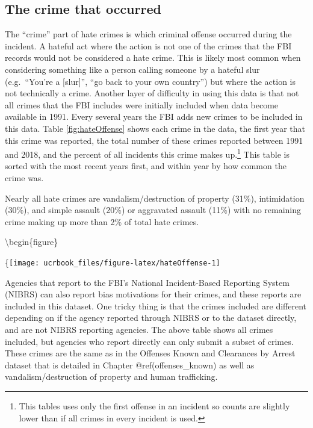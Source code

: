 \documentclass[
  12pt,
  openany]{book}
\begin{document}
\hypertarget{the-crime-that-occurred}{%
\subsection{The crime that occurred}\label{the-crime-that-occurred}}

The ``crime'' part of hate crimes is which criminal offense occurred during the incident. A hateful act where the action is not one of the crimes that the FBI records would not be considered a hate crime. This is likely most common when considering something like a person calling someone by a hateful slur (e.g.~``You're a {[}slur{]}'', ``go back to your own country'') but where the action is not technically a crime. Another layer of difficulty in using this data is that not all crimes that the FBI includes were initially included when data become available in 1991. Every several years the FBI adds new crimes to be included in this data. Table \ref{fig:hateOffense} shows each crime in the data, the first year that this crime was reported, the total number of these crimes reported between 1991 and 2018, and the percent of all incidents this crime makes up.\footnote{This tables uses only the first offense in an incident so counts are slightly lower than if all crimes in every incident is used.} This table is sorted with the most recent years first, and within year by how common the crime was.

Nearly all hate crimes are vandalism/destruction of property (31\%), intimidation (30\%), and simple assault (20\%) or aggravated assault (11\%) with no remaining crime making up more than 2\% of total hate crimes.

\textbackslash begin\{figure\}

\{\centering \texttt{[image: ucrbook\_files/figure-latex/hateOffense-1]}

Agencies that report to the FBI's National Incident-Based Reporting System (NIBRS) can also report bias motivations for their crimes, and these reports are included in this dataset. One tricky thing is that the crimes included are different depending on if the agency reported through NIBRS or to the dataset directly, and are not NIBRS reporting agencies. The above table shows all crimes included, but agencies who report directly can only submit a subset of crimes. These crimes are the same as in the Offenses Known and Clearances by Arrest dataset that is detailed in Chapter @ref(offenses\_known) as well as vandalism/destruction of property and human trafficking.
\end{document}
